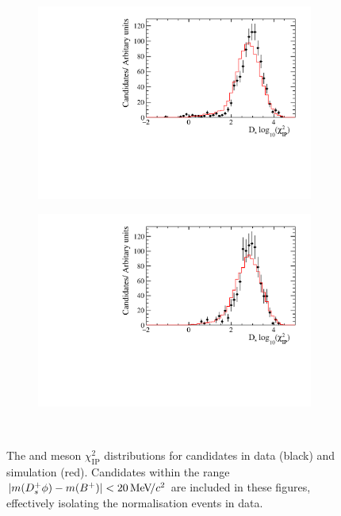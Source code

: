 \begin{figure}[!h]
\begin{subfigure}[t]{0.32\textwidth}
      \includegraphics[width=1.0\textwidth]{figs/Selection/Data_MC_Comparison_Var_2_B2DsD0_Ds2PiPiPi.pdf}
      \caption{\decay{\Dsp}{\pip\pim\pip}}
   \end{subfigure}
   \begin{subfigure}[t]{0.32\textwidth}
      \centering
      \includegraphics[width=1.0\textwidth]{figs/Selection/Data_MC_Comparison_Var_2_B2DsD0_Ds2KPiPi.pdf}
      \caption{\decay{\Dsp}{\Kp\pim\pip}}
   \end{subfigure}\\
   \caption{The \Bp and \Dsp meson $\chi^{2}_{\text{IP}}$ distributions for \decay{\Bp}{\Dsp\Dzb} candidates in data (black) and simulation (red). Candidates within the range $|m({{D}^+_{s}}\phi) - m({{{B}^+}})| < 20 {\mathrm{\,Me\kern -0.1em V\!/}c^2}$ are included in these figures, effectively isolating the normalisation events in data.}
   \label{fig:ipchi2dist_normalisation}   
\end{figure}


